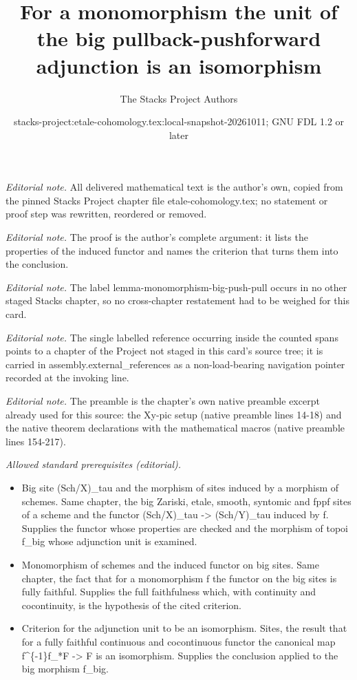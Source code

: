 \documentclass[10pt,a4paper]{amsart}
\title{For a monomorphism the unit of the big pullback-pushforward adjunction is an isomorphism}
\author{The Stacks Project Authors}
\date{stacks-project:etale-cohomology.tex:local-snapshot-20261011; GNU FDL 1.2 or later}
\theoremstyle{plain}
\theoremstyle{definition}
\theoremstyle{remark}
\numberwithin{equation}{subsection}
\begin{document}
\maketitle
\noindent\textit{Editorial note.} All delivered mathematical text is the author's own, copied from the pinned Stacks Project chapter file etale-cohomology.tex; no statement or proof step was rewritten, reordered or removed.\par\medskip
\noindent\textit{Editorial note.} The proof is the author's complete argument: it lists the properties of the induced functor and names the criterion that turns them into the conclusion.\par\medskip
\noindent\textit{Editorial note.} The label lemma-monomorphism-big-push-pull occurs in no other staged Stacks chapter, so no cross-chapter restatement had to be weighed for this card.\par\medskip
\noindent\textit{Editorial note.} The single labelled reference occurring inside the counted spans points to a chapter of the Project not staged in this card's source tree; it is carried in assembly.external\_references as a non-load-bearing navigation pointer recorded at the invoking line.\par\medskip
\noindent\textit{Editorial note.} The preamble is the chapter's own native preamble excerpt already used for this source: the Xy-pic setup (native preamble lines 14-18) and the native theorem declarations with the mathematical macros (native preamble lines 154-217).\par\medskip
\noindent\textit{Allowed standard prerequisites (editorial).}\begin{itemize}
\item Big site (Sch/X)\_tau and the morphism of sites induced by a morphism of schemes. Same chapter, the big Zariski, etale, smooth, syntomic and fppf sites of a scheme and the functor (Sch/X)\_tau -> (Sch/Y)\_tau induced by f. Supplies the functor whose properties are checked and the morphism of topoi f\_big whose adjunction unit is examined.
\item Monomorphism of schemes and the induced functor on big sites. Same chapter, the fact that for a monomorphism f the functor on the big sites is fully faithful. Supplies the full faithfulness which, with continuity and cocontinuity, is the hypothesis of the cited criterion.
\item Criterion for the adjunction unit to be an isomorphism. Sites, the result that for a fully faithful continuous and cocontinuous functor the canonical map f\textasciicircum{}\{-1\}f\_*F -> F is an isomorphism. Supplies the conclusion applied to the big morphism f\_big.
\end{itemize}\medskip
\end{document}
